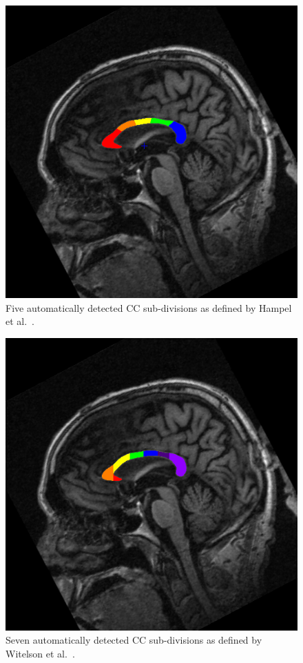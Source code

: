 \documentclass[11pt]{article}
\begin{document}
\begin{figure}[t!]
\begin{center}
\includegraphics[scale=.5]{v1_cc_hampel.jpg}
\caption{Five automatically detected CC sub-divisions as defined by Hampel et al.\ 
\citep{Hampel1998-fz}.
}
\label{fig:hampel}
\end{center}
\end{figure}

\begin{figure}[H]
\begin{center}
\includegraphics[scale=.5]{v1_cc_witelson.jpg}
\caption{Seven automatically detected CC sub-divisions as defined by Witelson et al.\ 
\citep{Narayan2016-es}.
}
\label{fig:witelson}
\end{center}
\end{figure}
\end{document}
